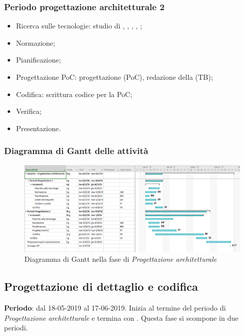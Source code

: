         \subsubsection{Periodo progettazione architetturale 2}
            \begin{itemize}
                \item Ricerca sulle tecnologie: studio di , , , , ;
                \item Normazione;
                \item Pianificazione;
                \item Progettazione PoC: progettazione (PoC), redazione della  (TB);
                \item Codifica: scrittura codice per la PoC;
                \item Verifica;
                \item Presentazione.
            \end{itemize}

        \subsubsection{Diagramma di Gantt delle attività}
            \begin{figure}[H]
                \centering
                \includegraphics[width=\textwidth,height=\textheight,keepaspectratio]{immagini/gantt/GantRP.png}
                \caption{Diagramma di Gantt nella fase di \textit{Progettazione architetturale}}
            \end{figure}

    \subsection{Progettazione di dettaglio e codifica}
    \textbf{Periodo}: dal 18-05-2019 al 17-06-2019.  \newline
    Inizia al termine del periodo di \textit{Progettazione architetturale} e termina con \RQ.
    Questa fase si scompone in due periodi.
